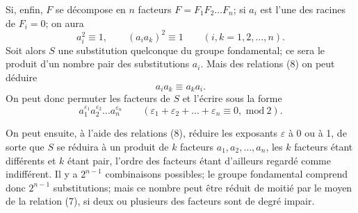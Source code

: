\documentclass{article}
\begin{document}
Si, enfin, $F$ se décompose en $n$ facteurs $F = F_{1}F_{2}\ldots F_{n}$; si $a_{i}$ est l'une des racines de $F_{i} = 0$; on aura
\[ a^{2}_{i} \equiv 1, \qquad (a_{i}a_{k})^{2} \equiv 1 \qquad (i, k = 1, 2, \ldots, n). \tag{8} \]
Soit alors $S$ une substitution quelconque du groupe fondamental; ce sera le produit d'un nombre pair des substitutions $a_{i}$. Mais des relations (8) on peut déduire
\[ a_{i}a_{k} \equiv a_{k}a_{i}. \]
On peut donc permuter les facteurs de $S$ et l'écrire sous la forme
\[ a^{\varepsilon_{1}}_{1} a^{\varepsilon_{2}}_{2} \ldots a^{\varepsilon_{n}}_{n} \qquad (\varepsilon_{1} + \varepsilon_{2} + \ldots + \varepsilon_{n} \equiv 0, \text{ mod}\ 2). \]

On peut ensuite, à l'aide des relations (8), réduire les exposants $\varepsilon$ à 0 ou à 1, de sorte que $S$ se réduira à un produit de $k$ facteurs $a_{1}, a_{2}, \ldots, a_{n}$, les $k$ facteurs étant différents et $k$ étant pair, l'ordre des facteurs étant d'ailleurs regardé comme indifférent. Il y a $2^{n-1}$ combinaisons possibles; le groupe fondamental comprend donc $2^{n-1}$ substitutions; mais ce nombre peut être réduit de moitié par le moyen de la relation (7), si deux ou plusieurs des facteurs sont de degré impair.
\end{document}
